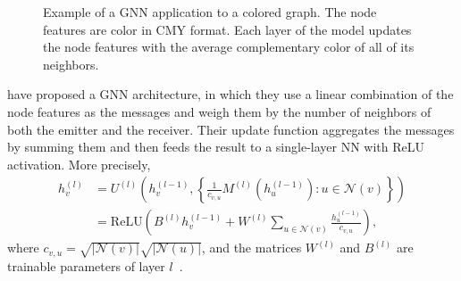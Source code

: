 \begin{figure}[h]
    \caption{Example of a GNN application to a colored graph. The node features are color in CMY format. Each layer of the model updates the node features with the average complementary color of all of its neighbors.}
    \label{fig:gnn-example}
\end{figure}

 have proposed a GNN architecture, in which they use a linear combination of the node features as the messages and weigh them by the number of neighbors of both the emitter and the receiver.
Their update function aggregates the messages by summing them and then feeds the result to a single-layer NN with ReLU activation.
More precisely,
\begin{equation}\label{eq:graph-conv-kipf-2017}
\begin{aligned}
    h^{(l)}_v &= U^{(l)}\left( h^{(l-1)}_v, \left\{ \frac{1}{c_{v,u}}M^{(l)}(h^{(l-1)}_u):u\in \mathcal{N}(v) \right\}  \right)  \\
    &= \text{ReLU}\left( B^{(l)}h^{(l-1)}_v + W^{(l)} \sum_{u\in \mathcal{N}(v)} \frac{h^{(l-1)}_u }{c_{v,u}} \right)
,\end{aligned}
\end{equation}
where $c_{v,u}=\sqrt{|\mathcal{N}(v)|} \sqrt{|\mathcal{N}(u)|} $, and the matrices $W^{(l)}$ and $B^{(l)}$ are trainable parameters of layer $l$~\cite{sanchez-lengelingGentleIntroductionGraph2021}.


